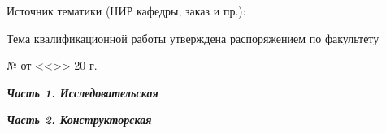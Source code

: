 \documentclass[utf8x, 14pt, oneside, a4paper]{article}
\begin{document}
	\vfill

	\begin{flushleft}
		\fontsize{12pt}{\baselineskip}\selectfont

		Источник тематики (НИР кафедры, заказ и пр.): \uline{\hfill}

		\uline{\hfill}

		\uline{\hfill}

		\uline{\hfill}
	\end{flushleft}

	\vfill

	\begin{flushleft}
		\fontsize{12pt}{\baselineskip}\selectfont

		Тема квалификационной работы утверждена распоряжением по факультету
		
		\uline{\hspace*{5cm}} № \uline{\hspace*{3cm}} от <<\uline{\hspace*{5mm}}>> \uline{\hspace*{2.5cm}} 20\uline{\hspace*{5mm}} г.
	\end{flushleft}

	\vfill

	\begin{flushleft}
		\fontsize{12pt}{\baselineskip}\selectfont

		\textbf{\textit{Часть 1. Исследовательская}}
		
		\uline{\hfill}
		
		\uline{\hfill}
		
		\uline{\hfill}

		\uline{\hfill}

		\uline{\hfill}

		\uline{\hfill}

		\uline{\hfill}

		\uline{\hfill}

		\uline{\hfill}
	\end{flushleft}

	\pagebreak

	\thispagestyle{empty}

	\begin{flushleft}
		\fontsize{12pt}{\baselineskip}\selectfont

		\textbf{\textit{Часть 2. Конструкторская}}
		
		\uline{\hfill}
		
		\uline{\hfill}
		
		\uline{\hfill}

		\uline{\hfill}

		\uline{\hfill}

		\uline{\hfill}

		\uline{\hfill}

		\uline{\hfill}

		\uline{\hfill}

		\uline{\hfill}
	\end{flushleft}
\end{document}
